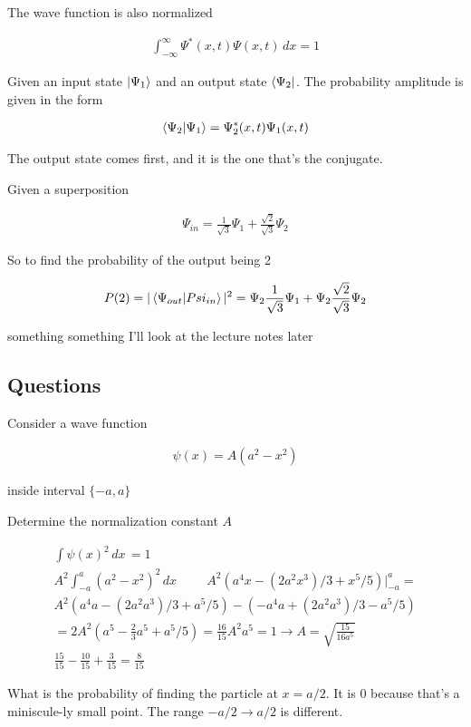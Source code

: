 \documentclass[fleqn]{report}
\newcommand{\hp}{\hspace{1cm}}
\newcommand{\equations} [1] {
\begin{gather*}
#1
\end{gather*}
}
\begin{document}
The wave function is also normalized

\equations{
    \int^\infty_{-\infty}
    \Psi^*(x, t) 
    \Psi(x, t) 
    \, dx
    =
    1
}

Given an input state $\ket{\Psi_1}$ and an output state 
$\bra{\Psi_2}$. The probability amplitude is given in the form 

\equations{
    \bra{\Psi_2} \ket{\Psi_1}
    =
    \Psi_2^*(x, t) 
    \Psi_1(x, t) 
}

The output state comes first, and it is the one that's the conjugate.

Given a superposition 
\equations{
    \Psi_{in}
    =
    \frac{1}{\sqrt{3}}
    \Psi_1
    +
    \frac{\sqrt{2}}{\sqrt{3}}
    \Psi_2
}

So to find the probability of the output being 2

\equations{
    P(2)
    =
    |\bra{\Psi_{out}} \ket{Psi_{in}}|^2
    =
    \Psi_2
    \frac{1}{\sqrt{3}}
    \Psi_1
    +
    \Psi_2
    \frac{\sqrt{2}}{\sqrt{3}}
    \Psi_2
}
something something I'll look at the lecture notes later 

\subsection{Questions}

Consider a wave function 
\equations{
    \psi(x)
    =
    A(a^2 - x^2)
}

inside interval $\{-a, a\}$

Determine the normalization constant $A$ 

\equations{
    \int \psi(x)^2 \, dx \, = 1
    \\
    A^2
    \int^a_{-a} 
    (a^2 - x^2)^2
    \, dx 
    \hp 
    A^2 
    \left(
        a^4 x - (2 a^2 x^3)/3 + x^5/5
    \right) \Big|^a_{-a}
    =
    \\
    A^2 
    \left(
        a^4 a - (2 a^2 a^3)/3 + a^5/5
    \right)
    -
    \left(
        -a^4 a + (2 a^2 a^3)/3 - a^5/5
    \right)
    \\
    =
    2A^2 
    \left(
        a^5 - \frac{2}{3}a^5 + a^5/5
    \right)
    =
    \frac{16}{15} A^2 a^5 = 1
    \rightarrow 
    A 
    =
    \sqrt{\frac{15}{16 a^5}} 
    \\
    \frac{15}{15} - \frac{10}{15} + \frac{3}{15}
    =
    \frac{8}{15}
}

What is the probability of finding the particle at $x = a/2$. It is 0 
because that's a miniscule-ly small point. The range $-a/2 \to a/2$ is different. 
\end{document}
